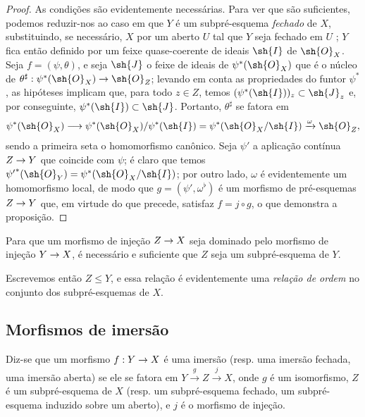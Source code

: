 \documentclass[oneside]{amsart}
\makeatletter
\renewcommand{\leq}{\leqslant}
\newcommand{\ega@arrow}[2]{\mathchoice{#1}{#2}{#2}{#2}}
\renewcommand{\to}{\ega@arrow{\longrightarrow}{\rightarrow}}
\newcommand{\oldpage}[2][]{{\marginnote{\normalfont\textbf{#1}~|~#2}}\ignorespaces}
\let\EGAOriginalLabel\label
\renewcommand{\label}[1]{\phantomsection\EGAOriginalLabel{#1}}
\makeatother
\begin{document}
\begin{proof}
As condições são evidentemente necessárias.
Para ver que são suficientes, podemos reduzir-nos ao caso em que $Y$ é um subpré-esquema \emph{fechado} de $X$, substituindo, se necessário, $X$ por um aberto $U$ tal que $Y$ seja fechado em $U$ ;
$Y$ fica então definido por um feixe quase-coerente de ideais $\sh{I}$ de $\sh{O}_X$.
Seja $f=(\psi,\theta)$, e seja $\sh{J}$ o feixe de ideais de $\psi^*(\sh{O}_X)$ que é o núcleo de $\theta^\sharp:\psi^*(\sh{O}_X)\to\sh{O}_Z$;
levando em conta as propriedades do funtor $\psi^*$ , as hipóteses implicam que, para todo $z\in Z$, temos $(\psi^*(\sh{I}))_z\subset\sh{J}_z$ e, por conseguinte, $\psi^*(\sh{I})\subset\sh{J}$.
Portanto, $\theta^\sharp$ se fatora em
\[
  \psi^*(\sh{O}_X)\to\psi^*(\sh{O}_X)/\psi^*(\sh{I})=\psi^*(\sh{O}_X/\sh{I})\xrightarrow{\omega}\sh{O}_Z,
\]
sendo a primeira seta o homomorfismo canônico.
Seja $\psi'$ a aplicação contínua $Z\to Y$ que coincide com $\psi$;
é claro que temos ${\psi'}^*(\sh{O}_Y)=\psi^*(\sh{O}_X/\sh{I})$;
por outro lado, $\omega$ é evidentemente um homomorfismo local, de modo que $g=(\psi',\omega^\flat)$ é um morfismo
\oldpage[I]{122}
de pré-esquemas $Z\to Y$  que, em virtude do que precede, satisfaz $f=j\circ g$, o que demonstra a proposição.
\end{proof}

\begin{corollary}[4.1.10]
\label{I.4.1.10}
Para que um morfismo de injeção $Z\to X$ seja dominado pelo morfismo de injeção $Y\to X$, é necessário e suficiente que $Z$ seja um subpré-esquema de $Y$.
\end{corollary}

Escrevemos então $Z\leq Y$, e essa relação é evidentemente uma \emph{relação de ordem} no conjunto dos subpré-esquemas de $X$.

\subsection{Morfismos de imersão}
\label{subsection:I.4.2}

\begin{definition}[4.2.1]
\label{I.4.2.1}
Diz-se que um morfismo $f:Y\to X$ é uma imersão (resp. uma imersão fechada, uma imersão aberta) se ele se fatora em $Y\xrightarrow{g}Z\xrightarrow{j}X$, onde $g$ é um isomorfismo, $Z$ é um subpré-esquema de $X$ (resp. um subpré-esquema fechado, um subpré-esquema induzido sobre um aberto), e $j$ é o morfismo de injeção.
\end{definition}
\end{document}
